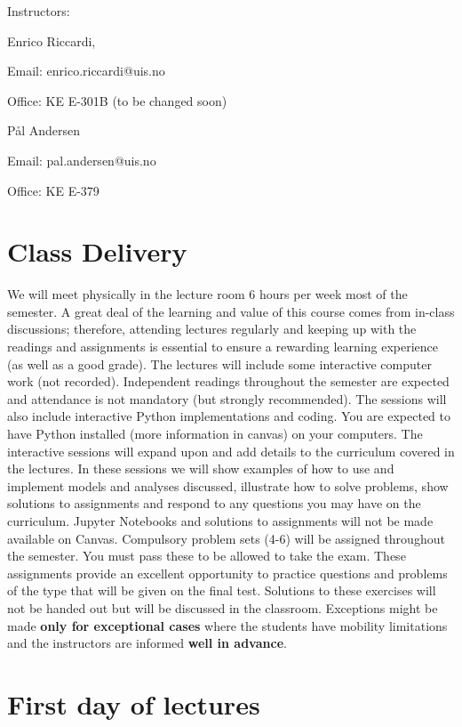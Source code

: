 \documentclass[letterpaper,12pt,oneside]{article}
\begin{document}
Instructors:

Enrico Riccardi,

Email: enrico.riccardi@uis.no

Office: KE E-301B (to be changed soon)

\vspace{1em}

P\aa l Andersen

Email: pal.andersen@uis.no

Office: KE E-379


\section*{Class Delivery}


We will meet physically in the lecture room 6 hours per week most of the semester. A
great deal of the learning and value of this course comes from in-class discussions;
therefore, attending lectures regularly and keeping up with the readings and assignments
is essential to ensure a rewarding learning experience (as well as a good grade).
The lectures will include some interactive computer work (not recorded). Independent readings
throughout the semester are expected and attendance is not mandatory (but strongly recommended).
The sessions will also include interactive Python implementations and coding. You are
expected to have Python installed (more information in canvas) on your computers.
The interactive sessions will expand upon and add details to the curriculum covered in
the lectures. In these sessions we will show examples of how to use and implement
models and analyses discussed, illustrate how to solve problems, show solutions to
assignments and respond to any questions you may have on the curriculum. Jupyter
Notebooks and solutions to assignments will not be made available on
Canvas.
Compulsory problem sets (4-6) will be assigned throughout the semester. You must pass
these to be allowed to take the exam. These assignments provide an excellent opportunity to practice
questions and problems of the type that will be given on the final test. Solutions to these 
exercises will not be handed out but will be discussed in the classroom. Exceptions might be made \textbf{only for exceptional cases} where the students have mobility limitations and the instructors are informed \textbf{well in advance}.


\section*{First day of lectures}
\end{document}

